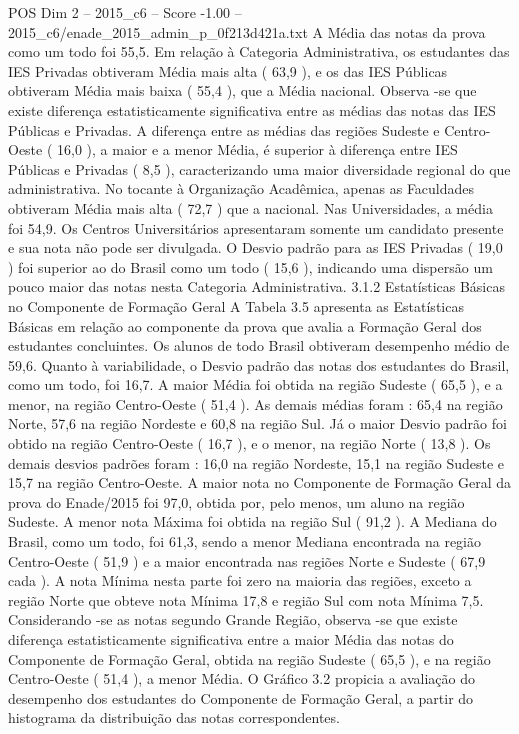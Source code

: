 \begin{textsample}{POS Dim 2 – 2015\_c6 – Score -1.00 – 2015\_c6/enade\_2015\_admin\_p\_0f213d421a.txt}
A Média das notas da prova como um todo foi 55,5.
Em relação à Categoria Administrativa, os estudantes das IES Privadas obtiveram Média mais alta ( 63,9 ), e os das IES Públicas obtiveram Média mais baixa ( 55,4 ), que a Média nacional.
Observa -se que existe diferença estatisticamente significativa entre as médias das notas das IES Públicas e Privadas.
A diferença entre as médias das regiões Sudeste e Centro-Oeste ( 16,0 ), a maior e a menor Média, é superior à diferença entre IES Públicas e Privadas ( 8,5 ), caracterizando uma maior diversidade regional do que administrativa.
No tocante à Organização Acadêmica, apenas as Faculdades obtiveram Média mais alta ( 72,7 ) que a nacional.
Nas Universidades, a média foi 54,9.
Os Centros Universitários apresentaram somente um candidato presente e sua nota não pode ser divulgada.
O Desvio padrão para as IES Privadas ( 19,0 ) foi superior ao do Brasil como um todo ( 15,6 ), indicando uma dispersão um pouco maior das notas nesta Categoria Administrativa. 3.1.2 Estatísticas Básicas no Componente de Formação Geral A Tabela 3.5 apresenta as Estatísticas Básicas em relação ao componente da prova que avalia a Formação Geral dos estudantes concluintes.
Os alunos de todo Brasil obtiveram desempenho médio de 59,6.
Quanto à variabilidade, o Desvio padrão das notas dos estudantes do Brasil, como um todo, foi 16,7.
A maior Média foi obtida na região Sudeste ( 65,5 ), e a menor, na região Centro-Oeste ( 51,4 ).
As demais médias foram : 65,4 na região Norte, 57,6 na região Nordeste e 60,8 na região Sul.
Já o maior Desvio padrão foi obtido na região Centro-Oeste ( 16,7 ), e o menor, na região Norte ( 13,8 ).
Os demais desvios padrões foram : 16,0 na região Nordeste, 15,1 na região Sudeste e 15,7 na região Centro-Oeste.
A maior nota no Componente de Formação Geral da prova do Enade/2015 foi 97,0, obtida por, pelo menos, um aluno na região Sudeste.
A menor nota Máxima foi obtida na região Sul ( 91,2 ).
A Mediana do Brasil, como um todo, foi 61,3, sendo a menor Mediana encontrada na região Centro-Oeste ( 51,9 ) e a maior encontrada nas regiões Norte e Sudeste ( 67,9 cada ).
A nota Mínima nesta parte foi zero na maioria das regiões, exceto a região Norte que obteve nota Mínima 17,8 e região Sul com nota Mínima 7,5.
Considerando -se as notas segundo Grande Região, observa -se que existe diferença estatisticamente significativa entre a maior Média das notas do Componente de Formação Geral, obtida na região Sudeste ( 65,5 ), e na região Centro-Oeste ( 51,4 ), a menor Média.
O Gráfico 3.2 propicia a avaliação do desempenho dos estudantes do Componente de Formação Geral, a partir do histograma da distribuição das notas correspondentes.

\end{textsample}
